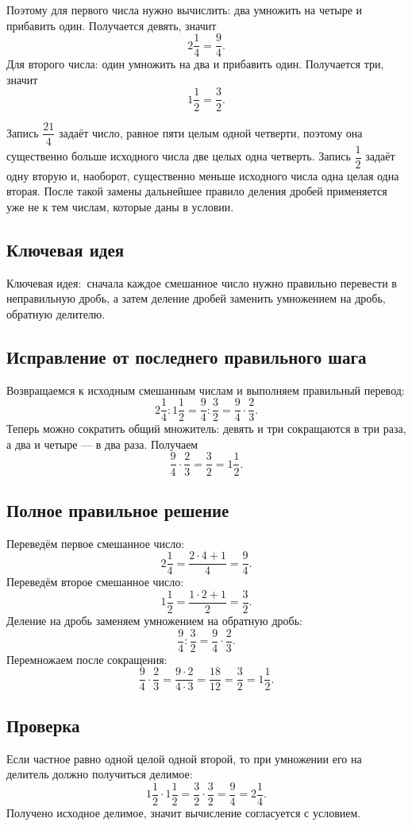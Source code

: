 \documentclass[12pt,a4paper]{article}
\newcommand{\KeyIdea}{\textcolor{blue!60!black}{Ключевая идея:}}
\begin{document}
Поэтому для первого числа нужно вычислить: два умножить на четыре и прибавить один. Получается девять, значит
\[
2\frac14=\frac94.
\]
Для второго числа: один умножить на два и прибавить один. Получается три, значит
\[
1\frac12=\frac32.
\]

Запись $\dfrac{21}{4}$ задаёт число, равное пяти целым одной четверти, поэтому она существенно больше исходного числа две целых одна четверть. Запись $\dfrac12$ задаёт одну вторую и, наоборот, существенно меньше исходного числа одна целая одна вторая. После такой замены дальнейшее правило деления дробей применяется уже не к тем числам, которые даны в условии.

\subsection*{Ключевая идея}
\KeyIdea\ сначала каждое смешанное число нужно правильно перевести в неправильную дробь, а затем деление дробей заменить умножением на дробь, обратную делителю.

\subsection*{Исправление от последнего правильного шага}
Возвращаемся к исходным смешанным числам и выполняем правильный перевод:
\[
2\frac14:1\frac12
=\frac94:\frac32
=\frac94\cdot\frac23.
\]
Теперь можно сократить общий множитель: девять и три сокращаются в три раза, а два и четыре --- в два раза. Получаем
\[
\frac94\cdot\frac23=\frac32=1\frac12.
\]

\subsection*{Полное правильное решение}
Переведём первое смешанное число:
\[
2\frac14=\frac{2\cdot4+1}{4}=\frac94.
\]
Переведём второе смешанное число:
\[
1\frac12=\frac{1\cdot2+1}{2}=\frac32.
\]
Деление на дробь заменяем умножением на обратную дробь:
\[
\frac94:\frac32=\frac94\cdot\frac23.
\]
Перемножаем после сокращения:
\[
\frac94\cdot\frac23
=\frac{9\cdot2}{4\cdot3}
=\frac{18}{12}
=\frac32
=1\frac12.
\]

\subsection*{Проверка}
Если частное равно одной целой одной второй, то при умножении его на делитель должно получиться делимое:
\[
1\frac12\cdot1\frac12
=\frac32\cdot\frac32
=\frac94
=2\frac14.
\]
Получено исходное делимое, значит вычисление согласуется с условием.
\end{document}
